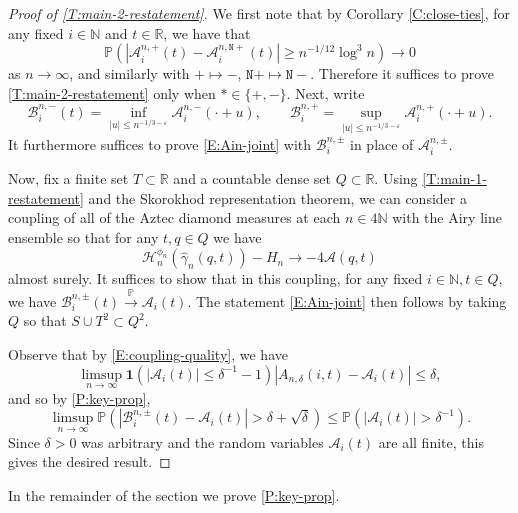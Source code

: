 \documentclass[11pt,twoside]{amsart}
\theoremstyle{plain}
\numberwithin{quest}{section}
\theoremstyle{remark}
\numberwithin{rem}{section}
\theoremstyle{definition}
\newcommand{\eps}{\varepsilon}
\newcommand{\N}{\mathbb{N}}
\newcommand{\R}{\mathbb{R}}
\renewcommand{\P}{\mathbb{P}}
\newcommand{\cA}{\mathcal{A}}
\newcommand{\cH}{\mathcal{H}}
\newcommand{\cvgp}{\stackrel{\mathbb P}{\to}}
\renewcommand{\tt}[1]{{\mathtt{#1}}}
\begin{document}
	\begin{proof}[Proof of \cref{T:main-2-restatement}]
		We first note that by Corollary \ref{C:close-ties}, for any fixed $i \in \N$ and $t \in \R$, we have that
		$$
		\P(|\cA_i^{n, +}(t) - \cA_i^{n, \tt{N}+}(t)| \ge n^{-1/12} \log^3 n) \to 0
		$$
		as $n \to \infty$, and similarly with $+ \mapsto -$,  $\tt{N}+\mapsto\tt{N}-$. Therefore it suffices to prove \cref{T:main-2-restatement} only when $* \in \{+, -\}$. Next, write
		$$
		\mathcal B_i^{n, -}(t) = \inf_{|u| \le n^{-1/3-\eps}} \cA_i^{n, -}(\cdot + u), \qquad \mathcal B_i^{n, +} = \sup_{|u| \le n^{-1/3-\eps}} \cA_i^{n, +}(\cdot + u).
		$$
		It furthermore suffices to prove \eqref{E:Ain-joint} with $\mathcal B_i^{n, \pm}$ in place of $\mathcal A_i^{n, \pm}$. 
		
		Now, fix a finite set $T \subset \R$ and a countable dense set $Q \subset \R$. Using \cref{T:main-1-restatement} and the Skorokhod representation theorem, we can consider a coupling of all of the Aztec diamond measures at each $n \in 4 \N$ with the Airy line ensemble so that for any $t, q \in Q$ we have
		\begin{equation}
			\label{E:coupling-quality}
			\cH_n^{\phi_n}(\hat \gamma_n(q, t)) - H_n \to -4\cA(q, t)
		\end{equation}
		almost surely. It suffices to show that in this coupling, for any fixed $i \in \N, t \in Q$, we have
		$\mathcal B_i^{n, \pm}(t) \cvgp \cA_i(t)$. The statement \eqref{E:Ain-joint} then follows by taking $Q$ so that $S \cup  T^2 \subset Q^2$.
		
		
		Observe that by \eqref{E:coupling-quality}, we have
		$$
		\limsup_{n \to \infty} \mathbf{1}(|\cA_i(t)| \le \delta^{-1}-1) |A_{n, \delta}(i, t) - \cA_i(t)| \le \delta,
		$$
		and so by \cref{P:key-prop}, 
		$$
		\limsup_{n \to \infty} \P(|\mathcal B_i^{n, \pm}(t) - \cA_i(t)| > \delta + \sqrt{\delta}) \le \P(|\cA_i(t)| > \delta^{-1}).
		$$
		Since $\delta > 0$ was arbitrary and the random variables $\cA_i(t)$ are all finite, this gives the desired result.
	\end{proof}
	
	In the remainder of the section we prove \cref{P:key-prop}. 
	
\end{document}
